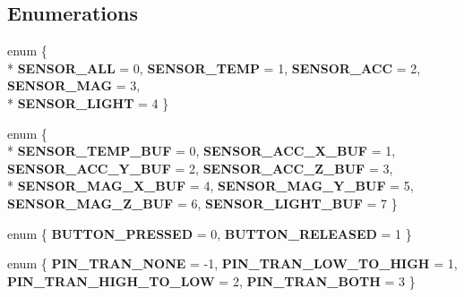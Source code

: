 \subsection*{Enumerations}
\begin{DoxyCompactItemize}
\item 
\hypertarget{group___engduino_protocol_ga99fb83031ce9923c84392b4e92f956b5}{}enum \{ \\*
{\bfseries S\+E\+N\+S\+O\+R\+\_\+\+A\+L\+L} = 0, 
{\bfseries S\+E\+N\+S\+O\+R\+\_\+\+T\+E\+M\+P} = 1, 
{\bfseries S\+E\+N\+S\+O\+R\+\_\+\+A\+C\+C} = 2, 
{\bfseries S\+E\+N\+S\+O\+R\+\_\+\+M\+A\+G} = 3, 
\\*
{\bfseries S\+E\+N\+S\+O\+R\+\_\+\+L\+I\+G\+H\+T} = 4
 \}\label{group___engduino_protocol_ga99fb83031ce9923c84392b4e92f956b5}

\item 
\hypertarget{group___engduino_protocol_gabc6126af1d45847bc59afa0aa3216b04}{}enum \{ \\*
{\bfseries S\+E\+N\+S\+O\+R\+\_\+\+T\+E\+M\+P\+\_\+\+B\+U\+F} = 0, 
{\bfseries S\+E\+N\+S\+O\+R\+\_\+\+A\+C\+C\+\_\+\+X\+\_\+\+B\+U\+F} = 1, 
{\bfseries S\+E\+N\+S\+O\+R\+\_\+\+A\+C\+C\+\_\+\+Y\+\_\+\+B\+U\+F} = 2, 
{\bfseries S\+E\+N\+S\+O\+R\+\_\+\+A\+C\+C\+\_\+\+Z\+\_\+\+B\+U\+F} = 3, 
\\*
{\bfseries S\+E\+N\+S\+O\+R\+\_\+\+M\+A\+G\+\_\+\+X\+\_\+\+B\+U\+F} = 4, 
{\bfseries S\+E\+N\+S\+O\+R\+\_\+\+M\+A\+G\+\_\+\+Y\+\_\+\+B\+U\+F} = 5, 
{\bfseries S\+E\+N\+S\+O\+R\+\_\+\+M\+A\+G\+\_\+\+Z\+\_\+\+B\+U\+F} = 6, 
{\bfseries S\+E\+N\+S\+O\+R\+\_\+\+L\+I\+G\+H\+T\+\_\+\+B\+U\+F} = 7
 \}\label{group___engduino_protocol_gabc6126af1d45847bc59afa0aa3216b04}

\item 
\hypertarget{group___engduino_protocol_gadc29c2ff13d900c2f185ee95427fb06c}{}enum \{ {\bfseries B\+U\+T\+T\+O\+N\+\_\+\+P\+R\+E\+S\+S\+E\+D} = 0, 
{\bfseries B\+U\+T\+T\+O\+N\+\_\+\+R\+E\+L\+E\+A\+S\+E\+D} = 1
 \}\label{group___engduino_protocol_gadc29c2ff13d900c2f185ee95427fb06c}

\item 
\hypertarget{group___engduino_protocol_ga61dadd085c1777f559549e05962b2c9e}{}enum \{ {\bfseries P\+I\+N\+\_\+\+T\+R\+A\+N\+\_\+\+N\+O\+N\+E} = -\/1, 
{\bfseries P\+I\+N\+\_\+\+T\+R\+A\+N\+\_\+\+L\+O\+W\+\_\+\+T\+O\+\_\+\+H\+I\+G\+H} = 1, 
{\bfseries P\+I\+N\+\_\+\+T\+R\+A\+N\+\_\+\+H\+I\+G\+H\+\_\+\+T\+O\+\_\+\+L\+O\+W} = 2, 
{\bfseries P\+I\+N\+\_\+\+T\+R\+A\+N\+\_\+\+B\+O\+T\+H} = 3
 \}\label{group___engduino_protocol_ga61dadd085c1777f559549e05962b2c9e}

\end{DoxyCompactItemize}
